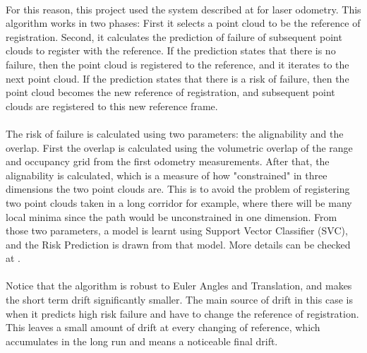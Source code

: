 \documentclass[11pt]{article}
\begin{document}
	\paragraph{}
	For this reason, this project used the system described at \cite{AICPAlign} for laser odometry. This algorithm works in two phases: First it selects a point cloud to be the reference of registration. Second, it calculates the prediction of failure of subsequent point clouds to register with the reference. If the prediction states that there is no failure, then the point cloud is registered to the reference, and it iterates to the next point cloud. If the prediction states that there is a risk of failure, then the point cloud becomes the new reference of registration, and subsequent point clouds are registered to this new reference frame.
	
	\paragraph{}
	The risk of failure is calculated using two parameters: the alignability and the overlap. First the overlap is calculated using the volumetric overlap of the range and occupancy grid from the first odometry measurements. After that, the alignability is calculated, which is a measure of how "constrained" in three dimensions the two point clouds are. This is to avoid the problem of registering two point clouds taken in a long corridor for example, where there will be many local minima since the path would be unconstrained in one dimension. From those two parameters, a model is learnt using Support Vector Classifier (SVC), and the Risk Prediction is drawn from that model. More details can be checked at \cite{AICPAlign}.
	
	\paragraph{}
	Notice that the algorithm is robust to Euler Angles and Translation, and makes the short term drift significantly smaller. The main source of drift in this case is when it predicts high risk failure and have to change the reference of registration. This leaves a small amount of drift at every changing of reference, which accumulates in the long run and means a noticeable final drift.
	
\end{document}
